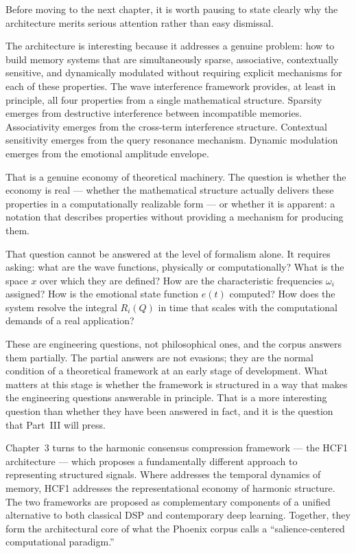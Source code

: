 Before moving to the next chapter, it is worth pausing to state
clearly why the \MEMeight{} architecture merits serious attention
rather than easy dismissal.

The architecture is interesting because it addresses a genuine
problem: how to build memory systems that are simultaneously sparse,
associative, contextually sensitive, and dynamically modulated
without requiring explicit mechanisms for each of these properties.
The wave interference framework provides, at least in principle,
all four properties from a single mathematical structure. Sparsity
emerges from destructive interference between incompatible memories.
Associativity emerges from the cross-term interference structure.
Contextual sensitivity emerges from the query resonance mechanism.
Dynamic modulation emerges from the emotional amplitude envelope.

That is a genuine economy of theoretical machinery. The question
is whether the economy is real --- whether the mathematical
structure actually delivers these properties in a computationally
realizable form --- or whether it is apparent: a notation that
describes properties without providing a mechanism for producing
them.

That question cannot be answered at the level of formalism alone.
It requires asking: what are the wave functions, physically or
computationally? What is the space $x$ over which they are defined?
How are the characteristic frequencies $\omega_i$ assigned? How
is the emotional state function $e(t)$ computed? How does the
system resolve the integral $R_i(Q)$ in time that scales with the
computational demands of a real application?

These are engineering questions, not philosophical ones, and the
corpus answers them partially. The partial answers are not evasions;
they are the normal condition of a theoretical framework at an
early stage of development. What matters at this stage is whether
the framework is structured in a way that makes the engineering
questions answerable in principle. That is a more interesting
question than whether they have been answered in fact, and it is
the question that Part~III will press.

\medskip

Chapter~3 turns to the harmonic consensus compression framework
--- the HCF1 architecture --- which proposes a fundamentally
different approach to representing structured signals. Where
\MEMeight{} addresses the temporal dynamics of memory, HCF1
addresses the representational economy of harmonic structure. The
two frameworks are proposed as complementary components of a unified
alternative to both classical DSP and contemporary deep learning.
Together, they form the architectural core of what the Phoenix
corpus calls a \enquote{salience-centered computational paradigm.}
